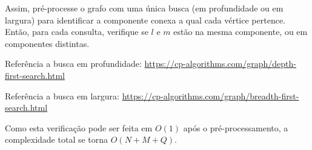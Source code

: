 Assim, pré-processe o grafo com uma única busca (em profundidade ou em largura) para identificar
a componente conexa a qual cada vértice pertence. Então, para cada consulta,
verifique se $l$ e $m$ estão na mesma componente, ou em componentes distintas.

Referência a busca em profundidade: \url{https://cp-algorithms.com/graph/depth-first-search.html}  

Referência a busca em largura: \url{https://cp-algorithms.com/graph/breadth-first-search.html}

Como esta verificação pode ser feita em $O(1)$ após o pré-processamento, a complexidade total se torna
$O(N+M+Q)$.
